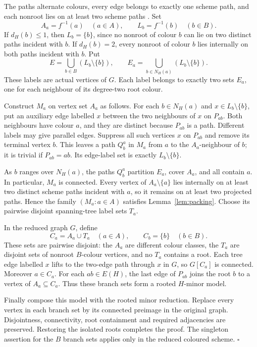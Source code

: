 \documentclass[11pt]{amsart}
\begin{document}
The paths alternate colours, every edge belongs to exactly one scheme
path, and each nonroot lies on at least two scheme paths
\cite[Remark 3.2(1), (2), (6), (7)]{KPR}. Set
\[
 A_a=f^{-1}(a)\quad(a\in A),
 \qquad L_b=f^{-1}(b)\quad(b\in B).
\]
If $d_H(b)\leq1$, then $L_b=\{b\}$, since no nonroot of colour $b$ can
lie on two distinct paths incident with $b$. If $d_H(b)=2$, every nonroot
of colour $b$ lies internally on both paths incident with $b$. Put
\[
 E=\bigcup_{b\in B}(L_b\setminus\{b\}),
 \qquad E_a=\bigcup_{b\in N_H(a)}(L_b\setminus\{b\}).
\]
These labels are actual vertices of $G$. Each label belongs to exactly
two sets $E_a$, one for each neighbour of its degree-two root colour.

Construct $M_a$ on vertex set $A_a$ as follows. For each $b\in N_H(a)$
and $x\in L_b\setminus\{b\}$, put an auxiliary edge labelled $x$ between
the two neighbours of $x$ on $P_{ab}$. Both neighbours have colour $a$,
and they are distinct because $P_{ab}$ is a path. Different labels may
give parallel edges. Suppress all such vertices $x$ on $P_{ab}$ and
remove its terminal vertex $b$. This leaves a path $Q_b^a$ in $M_a$ from
$a$ to the $A_a$-neighbour of $b$; it is trivial if $P_{ab}=ab$.
Its edge-label set is exactly $L_b\setminus\{b\}$.

As $b$ ranges over $N_H(a)$, the paths $Q_b^a$ partition $E_a$, cover
$A_a$, and all contain $a$. In particular, $M_a$ is connected. Every
vertex of $A_a\setminus\{a\}$ lies internally on at least two distinct
scheme paths incident with $a$, so it remains on at least two projected
paths. Hence the family $(M_a:a\in A)$ satisfies Lemma~\ref{lem:packing}.
Choose its pairwise disjoint spanning-tree label sets $T_a$.

In the reduced graph $G$, define
\[
 C_a=A_a\cup T_a\quad(a\in A),
 \qquad C_b=\{b\}\quad(b\in B).
\]
These sets are pairwise disjoint: the $A_a$ are different colour classes,
the $T_a$ are disjoint sets of nonroot $B$-colour vertices, and no $T_a$
contains a root. Each tree edge labelled $x$ lifts to the two-edge path
through $x$ in $G$, so $G[C_a]$ is connected. Moreover $a\in C_a$.
For each $ab\in E(H)$, the last edge of $P_{ab}$ joins the root $b$ to
a vertex of $A_a\subseteq C_a$. Thus these branch sets form a rooted
$H$-minor model.

Finally compose this model with the rooted minor reduction. Replace every
vertex in each branch set by its connected preimage in the original graph.
Disjointness, connectivity, root containment and required adjacencies are
preserved. Restoring the isolated roots completes the proof.
The singleton assertion for the $B$ branch sets applies only in the
reduced coloured scheme. \hfill$\square$
\end{document}
